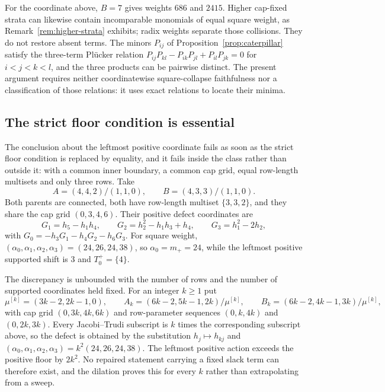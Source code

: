 \documentclass[11pt,a4paper]{amsart}
\numberwithin{equation}{section}
\theoremstyle{plain}
\theoremstyle{definition}
\begin{document}
For the coordinate above, \(B=7\) gives weights \(686\) and \(2415\).
Higher cap-fixed strata can likewise contain incomparable monomials of
equal square weight, as Remark~\ref{rem:higher-strata} exhibits; radix
weights separate those collisions.  They do not restore absent terms.
The minors \(P_{ij}\) of Proposition~\ref{prop:caterpillar} satisfy the
three-term Pl\"ucker relation \(P_{ij}P_{kl}-P_{ik}P_{jl}+P_{il}P_{jk}=0\)
for \(i<j<k<l\), and the three products can be pairwise distinct.  The
present argument requires neither coordinatewise square-collapse
faithfulness nor a classification of those relations: it uses exact
relations to locate their minima.

\subsection{The strict floor condition is essential}\label{subsec:floor-margin}

The conclusion about the leftmost positive coordinate fails as soon as the strict floor condition is replaced by equality, and it fails inside the class rather than outside it: with a common inner boundary, a common cap grid, equal row-length multisets and only three rows.  Take
\[
A=(4,4,2)/(1,1,0),
\qquad
B=(4,3,3)/(1,1,0).
\]
Both parents are connected, both have row-length multiset \(\{3,3,2\}\), and they share the cap grid \((0,3,4,6)\).  Their positive defect coordinates are
\[
G_1=h_5-h_1h_4,
\qquad
G_2=h_2^2-h_1h_3+h_4,
\qquad
G_3=h_1^2-2h_2,
\]
with \(G_0=-h_3G_1-h_4G_2-h_6G_3\).  For square weight, \((\alpha_0,\alpha_1,\alpha_2,\alpha_3)=(24,26,24,38)\),
so \(\alpha_0=m_+=24\), while the leftmost positive supported shift is \(3\) and \(T_0^+=\{4\}\).

The discrepancy is unbounded with the number of rows and the number of supported coordinates held fixed.  For an integer \(k\ge1\) put
\[
\mu^{[k]}=(3k-2,2k-1,0),
\qquad
A_k=(6k-2,5k-1,2k)/\mu^{[k]},
\qquad
B_k=(6k-2,4k-1,3k)/\mu^{[k]},
\]
with cap grid \((0,3k,4k,6k)\) and row-parameter sequences \((0,k,4k)\) and \((0,2k,3k)\).  Every Jacobi--Trudi subscript is \(k\) times the corresponding subscript above, so the defect is obtained by the substitution \(h_j\mapsto h_{kj}\) and \((\alpha_0,\alpha_1,\alpha_2,\alpha_3)=k^2(24,26,24,38)\).
The leftmost positive action exceeds the positive floor by \(2k^2\).  No repaired statement carrying a fixed slack term can therefore exist, and the dilation proves this for every \(k\) rather than extrapolating from a sweep.
\end{document}
